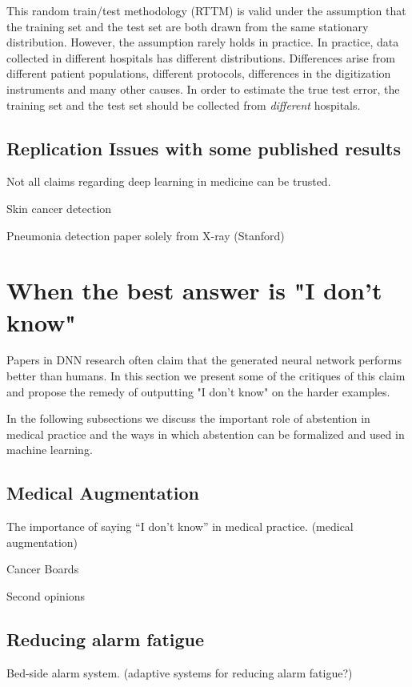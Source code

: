 \documentclass[fleqn,10pt]{wlscirep}
\begin{document}
This random train/test methodology (RTTM) is valid under the assumption that the training set and the test set are both drawn 
from the same stationary distribution. However, the assumption rarely holds in practice. In practice, data collected in different hospitals has different distributions. Differences arise from different patient populations, different protocols, differences in the digitization instruments and many other causes. In order to estimate the true test error, the training set and the test set should be collected from {\em different} hospitals.


\subsection*{Replication Issues with some published results}
Not all claims regarding deep learning in medicine can be trusted.

Skin cancer detection~\cite{esteva2017dermatologist}

Pneumonia detection paper solely from X-ray (Stanford)

\section{When the best answer is "I don't know"}

Papers in DNN research often claim that the generated neural network performs better than humans. In this section we present some of the critiques of this claim and propose the remedy of outputting "I don't know" on the harder examples.

In the following subsections we discuss the important role of abstention in medical practice and the ways in which abstention can be formalized and used in machine learning.

\subsection*{Medical Augmentation}
The importance of saying “I don’t know” in medical practice. (medical augmentation)

Cancer Boards

Second opinions

\subsection*{Reducing alarm fatigue}
Bed-side alarm system. (adaptive systems for reducing alarm fatigue?)
\end{document}
